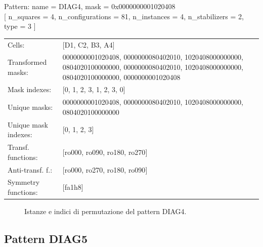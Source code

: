 \begin{tcolorbox}[sharp corners, fontupper=\ttfamily\small, colback=white]
  \noindent Pattern: name = DIAG4, mask = 0x0000000001020408\\
  {[} n\_squares = 4, n\_configurations = 81,
  n\_instances = 4, n\_stabilizers = 2, type = 3 { ]}\\[1.0ex]
  \begin{tabularx}{\textwidth}{@{} p{3.5cm} X @{}}
    Cells:               & {[}D1, C2, B3, A4{]}\\[0.5ex]
    Transformed masks:   & 0000000001020408, 0000000080402010, 1020408000000000, 0804020100000000, 0000000080402010, 1020408000000000, 0804020100000000, 0000000001020408\\[0.5ex]
    Mask indexes:        & {[}0, 1, 2, 3, 1, 2, 3, 0{]}\\[0.5ex]
    Unique masks:        & 0000000001020408, 0000000080402010, 1020408000000000, 0804020100000000\\[0.5ex]
    Unique mask indexes: & {[}0, 1, 2, 3{]}\\[0.5ex]
    Transf. functions:   & {[}ro000, ro090, ro180, ro270{]}\\[0.5ex]
    Anti-transf. f.:     & {[}ro000, ro270, ro180, ro090{]}\\[0.5ex]
    Symmetry functions:  & {[}fa1h8{]}\\[0.5ex]
  \end{tabularx}
\end{tcolorbox}

\begin{figure}[htbp]
  \centering
   \hfill
   \hfill
   \hfill
  \vspace{0.3cm}
   \hfill
   \hfill
   \hfill
  \caption{Istanze e indici di permutazione del pattern DIAG4.}
\end{figure}

\newpage

\subsection{Pattern DIAG5}

